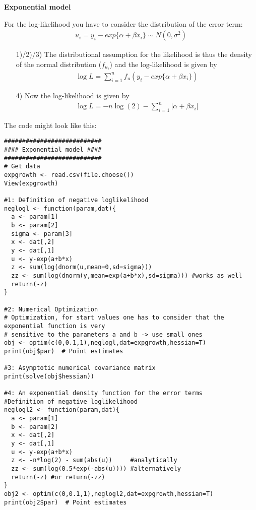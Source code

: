 \documentclass{article}
\begin{document}
\begin{solution}
\textbf{Exponential model}

For the log-likelihood you have to consider the distribution of the error
term:
\begin{align*}
  u_i = y_i - exp\{\alpha + \beta x_i\} \sim N(0,\sigma^2)
\end{align*}
\begin{itemize}
\item[1)/2)/3)] The distributional assumption for the likelihood is thus
    the density of the normal distribution ($f_{u_i}$) and the
    log-likelihood is given by
\begin{align*}
  \log L = \sum_{i=1}^n f_u(y_i - exp\{\alpha + \beta x_i\})
\end{align*}
\item[4)] Now the log-likelihood is given by
\begin{align*}
  \log L = -n \log(2) - \sum_{i=1}^n |\alpha + \beta x_i|
\end{align*}
\end{itemize}
The code might look like this:
\begin{verbatim}
###########################
#### Exponential model ####
###########################
# Get data
expgrowth <- read.csv(file.choose())
View(expgrowth)

#1: Definition of negative loglikelihood
neglogl <- function(param,dat){
  a <- param[1]
  b <- param[2]
  sigma <- param[3]
  x <- dat[,2]
  y <- dat[,1]
  u <- y-exp(a+b*x)
  z <- sum(log(dnorm(u,mean=0,sd=sigma)))
  zz <- sum(log(dnorm(y,mean=exp(a+b*x),sd=sigma))) #works as well
  return(-z)
}

#2: Numerical Optimization
# Optimization, for start values one has to consider that the exponential function is very
# sensitive to the parameters a and b -> use small ones
obj <- optim(c(0,0.1,1),neglogl,dat=expgrowth,hessian=T)
print(obj$par)  # Point estimates

#3: Asymptotic numerical covariance matrix
print(solve(obj$hessian))

#4: An exponential density function for the error terms
#Definition of negative loglikelihood
neglogl2 <- function(param,dat){
  a <- param[1]
  b <- param[2]
  x <- dat[,2]
  y <- dat[,1]
  u <- y-exp(a+b*x)
  z <- -n*log(2) - sum(abs(u))     #analytically
  zz <- sum(log(0.5*exp(-abs(u)))) #alternatively
  return(-z) #or return(-zz)
}
obj2 <- optim(c(0,0.1,1),neglogl2,dat=expgrowth,hessian=T)
print(obj2$par)  # Point estimates
\end{verbatim}
\end{solution}
\end{document}
